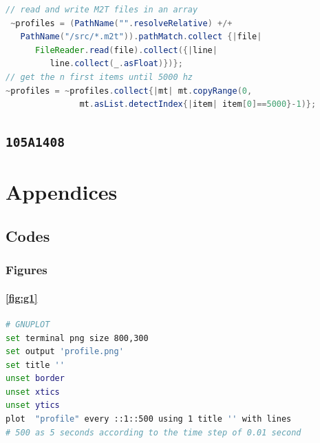 \documentclass{book}
\begin{document}
 \begin{lstlisting}[basicstyle=\footnotesize\ttfamily,language=Java]
// read and write M2T files in an array
 ~profiles = (PathName("".resolveRelative) +/+ 
   PathName("/src/*.m2t")).pathMatch.collect {|file| 
      FileReader.read(file).collect({|line| 
         line.collect(_.asFloat)})};
// get the n first items until 5000 hz
~profiles = ~profiles.collect{|mt| mt.copyRange(0, 
               mt.asList.detectIndex{|item| item[0]==5000}-1)};
 \end{lstlisting}
 
 \bigskip

\begin{mdframed}[style=stylesec]
\section{\texttt{105A1408}}
\label{105A1408}
\smallskip
\end{mdframed}


\bigskip

\backmatter



\appendix
\renewcommand\thefigure{\thesection.\arabic{figure}}    
\setcounter{figure}{0}    
\chapter{Appendices}
\thispagestyle{empty}
\makeatletter
\setcounter{secnumdepth}{4}
\makeatother
\renewcommand{\thesection}{\Alph{section}}
\section{Codes}

\subsection{Figures}
\subsubsection{\ref{fig:g1}}
\label{an:pro}
\begin{lstlisting}[language=bash]
# GNUPLOT
set terminal png size 800,300 
set output 'profile.png' 
set title ''
unset border
unset xtics
unset ytics
plot  "profile" every ::1::500 using 1 title '' with lines 
# 500 as 5 seconds according to the time step of 0.01 second
\end{lstlisting}
\end{document}
